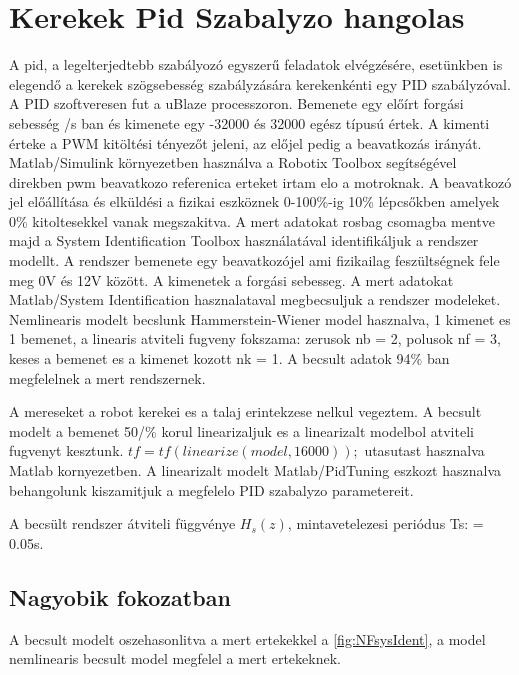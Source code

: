\section{Kerekek Pid Szabalyzo hangolas}

A pid, a legelterjedtebb szabályozó egyszerű feladatok elvégzésére, esetünkben is elegendő a kerekek szögsebesség szabályzására kerekenkénti egy PID szabályzóval. A PID szoftveresen fut a uBlaze processzoron. Bemenete egy előírt forgási sebesség \degree/s ban és kimenete egy -32000 és 32000 egész típusú értek. A kimenti érteke a PWM kitöltési tényezőt jeleni, az előjel pedig a beavatkozás irányát.
Matlab/Simulink környezetben használva a Robotix Toolbox segítségével direkben pwm beavatkozo referenica erteket irtam elo a motroknak. A beavatkozó jel előállítása és elküldési a fizikai eszköznek 0-100\%-ig 10\% lépcsőkben amelyek 0\% kitoltesekkel vanak megszakitva. A mert adatokat rosbag csomagba mentve majd a System Identification Toolbox használatával identifikáljuk a rendszer modellt. A rendszer bemenete egy beavatkozójel ami fizikailag feszültségnek fele meg 0V és 12V között. A kimenetek a forgási sebesseg.
A mert adatokat Matlab/System Identification hasznalataval megbecsuljuk a rendszer modeleket. Nemlinearis modelt becslunk 
Hammerstein-Wiener model \cite{matlabhwmmodel} hasznalva, 1 kimenet es 1 bemenet, a linearis atviteli fugveny fokszama:
zerusok nb = 2, polusok nf = 3, keses a bemenet es a kimenet kozott nk = 1. A becsult adatok 94\% ban megfelelnek a mert rendszernek.          

A mereseket a robot kerekei es a talaj erintekzese nelkul vegeztem.
A becsult modelt a bemenet 50/\%  korul linearizaljuk es a linearizalt modelbol atviteli fugvenyt kesztunk. 
$tf = tf(linearize(model,16000));$ utasutast hasznalva Matlab kornyezetben. A linearizalt modelt Matlab/PidTuning eszkozt hasznalva behangolunk kiszamitjuk a megfelelo PID szabalyzo parametereit.



A becsült rendszer átviteli függvénye $H_s(z)$, mintavetelezesi periódus Ts: = 0.05s.

\subsection*{Nagyobik fokozatban}

A becsult modelt oszehasonlitva a mert ertekekkel a \ref{fig:NFsysIdent}, a model nemlinearis becsult model megfelel a mert ertekeknek.

